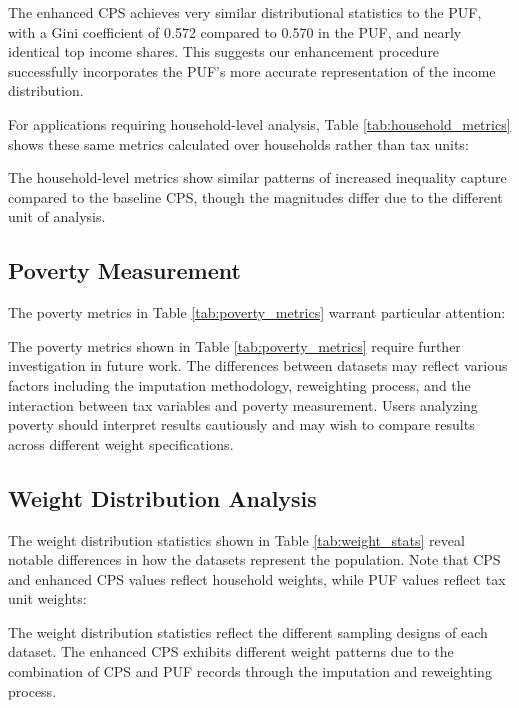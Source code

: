 

The enhanced CPS achieves very similar distributional statistics to the PUF, with a Gini coefficient of 0.572 compared to 0.570 in the PUF, and nearly identical top income shares. This suggests our enhancement procedure successfully incorporates the PUF's more accurate representation of the income distribution. 

For applications requiring household-level analysis, Table \ref{tab:household_metrics} shows these same metrics calculated over households rather than tax units:



The household-level metrics show similar patterns of increased inequality capture compared to the baseline CPS, though the magnitudes differ due to the different unit of analysis.

\subsection{Poverty Measurement}

The poverty metrics in Table \ref{tab:poverty_metrics} warrant particular attention:



The poverty metrics shown in Table \ref{tab:poverty_metrics} require further investigation in future work. The differences between datasets may reflect various factors including the imputation methodology, reweighting process, and the interaction between tax variables and poverty measurement. Users analyzing poverty should interpret results cautiously and may wish to compare results across different weight specifications.

\subsection{Weight Distribution Analysis}

The weight distribution statistics shown in Table \ref{tab:weight_stats} reveal notable differences in how the datasets represent the population. Note that CPS and enhanced CPS values reflect household weights, while PUF values reflect tax unit weights:



The weight distribution statistics reflect the different sampling designs of each dataset. The enhanced CPS exhibits different weight patterns due to the combination of CPS and PUF records through the imputation and reweighting process.

